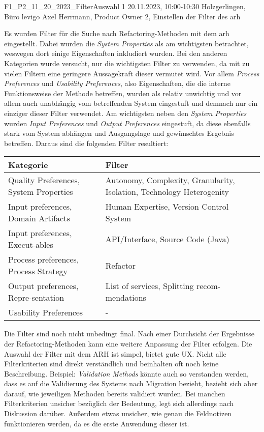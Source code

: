 \fieldnote
{F1\_P2\_11\_20\_2023\_FilterAuswahl}
{1}
{20.11.2023, 10:00-10:30}
{Holzgerlingen, Büro levigo}
{Axel Herrmann, Product Owner}
{2, Einstellen der Filter des \gls{arh}}
{
	Es wurden Filter für die Suche nach Refactoring-Methoden mit dem \gls{arh} eingestellt.
	Dabei wurden die \emph{System Properties} als am wichtigsten betrachtet, weswegen dort einige Eigenschaften inkludiert wurden.
	Bei den anderen Kategorien wurde versucht, nur die wichtigsten Filter zu verwenden, da mit zu vielen Filtern eine geringere Aussagekraft dieser vermutet wird.
	Vor allem \emph{Process Preferences} und \emph{Usability Preferences}, also Eigenschaften, die die interne Funktionsweise der Methode betreffen, wurden als relativ unwichtig und vor allem auch unabhängig vom betreffenden System eingestuft und demnach nur ein einziger dieser Filter verwendet.
	Am wichtigsten neben den \emph{System Properties} wurden \emph{Input Preferences} und \emph{Output Preferences} eingestuft, da diese ebenfalls stark vom System abhängen und Ausgangslage und gewünschtes Ergebnis betreffen.
	Daraus sind die folgenden Filter resultiert:
	\begin{tabular}{|p{4.5cm}|p{5.5cm}|}
		\hline
		\textbf{Kategorie} & \textbf{Filter} \\ \hline
		Quality Preferences, System Properties & Autonomy, Complexity, Granularity, Isolation, Technology Heterogenity \\ \hline
		Input preferences, Domain Artifacts & Human Expertise, Version Control System \\ \hline
		Input preferences, Execut-ables & API/Interface, Source Code (Java) \\ \hline
		Process preferences, Process Strategy & Refactor \\ \hline
		Output preferences, Repre-sentation & List of services, Splitting recom-mendations \\ \hline
		Usability Preferences & - \\ \hline
	\end{tabular}
}
{
	Die Filter sind noch nicht unbedingt final. Nach einer Durchsicht der Ergebnisse der Refactoring-Methoden kann eine weitere Anpassung der Filter erfolgen.
}
{
	Die Auswahl der Filter mit dem ARH ist simpel, bietet gute UX.
}
{
	Nicht alle Filterkriterien sind direkt verständlich und beinhalten oft noch keine Beschreibung. Beispiel: \emph{Validation Methods} könnte auch so verstanden werden, dass es auf die Validierung des Systems nach Migration bezieht, bezieht sich aber darauf, wie jeweiligen Methoden bereits validiert wurden.
}
{
	Bei manchen Filterkriterien unsicher bezüglich der Bedeutung, legt sich allerdings nach Diskussion darüber.
	Außerdem etwas unsicher, wie genau die Feldnotizen funktionieren werden, da es die erste Anwendung dieser ist.
}

